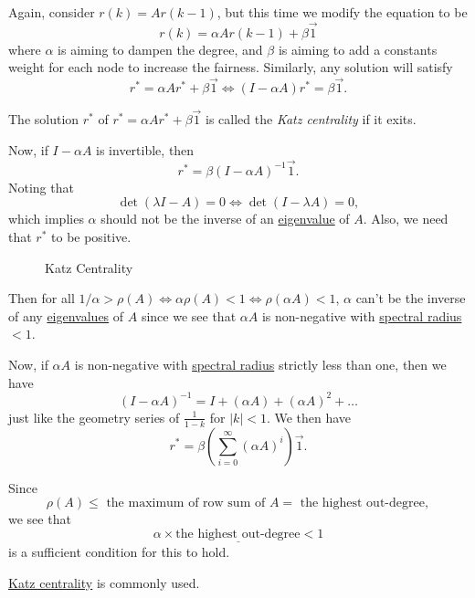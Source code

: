 \begin{problem}
Again, consider \(r(k) = Ar(k - 1)\), but this time we modify the equation to be
\[
	r(k) = \alpha Ar(k - 1) + \beta \vec{1}
\]
where \(\alpha\) is aiming to dampen the degree, and \(\beta\) is aiming to add a constants weight for each node to increase the fairness.
Similarly, any solution will satisfy
\[
	r^{\ast} = \alpha Ar^{\ast} + \beta \vec{1}\iff (I - \alpha A)r^{\ast} = \beta \vec{1}.
\]
\begin{definition}\label{def:Katz-centrality}
	The solution \(r^{\ast} \) of \(r^{\ast} = \alpha Ar^{\ast} + \beta \vec{1}\) is called the \emph{Katz centrality} if it exits.
\end{definition}

Now, if \(I - \alpha A\) is invertible, then
\[
	r^{\ast} = \beta(I - \alpha A)^{-1} \vec{1}.
\]
Noting that
\[
	\det(\lambda I - A) = 0 \iff \det(I - \lambda A) = 0,
\]
which implies \(\alpha\) should not be the inverse of an \hyperref[def:eigenvalue]{eigenvalue} of \(A\). Also, we  need that \(r^{\ast}\) to be positive.

\begin{figure}[H]
	\centering
	\caption{Katz Centrality}
	\label{fig:katz-centrality}
\end{figure}

Then for all \(1/\alpha > \rho(A) \iff \alpha\rho(A)<1 \iff \rho(\alpha A)<1\), \(\alpha\) can't be the inverse of any \hyperref[def:eigenvalue]{eigenvalues} of \(A\) since
we see that \(\alpha A\) is non-negative with \hyperref[def:spectral-radius]{spectral radius} \(<1\).

Now, if \(\alpha A\) is non-negative with \hyperref[def:spectral-radius]{spectral radius} strictly less than one, then we have
\[
	(I - \alpha A)^{-1} = I + (\alpha A) + (\alpha A)^2 + \ldots
\]
just like the geometry series of \(\frac{1}{1-k}\) for \(\left\vert k \right\vert <1 \). We then have
\[
	r^* = \beta\left(\sum\limits_{i=0}^{\infty} (\alpha A)^i\right)\vec{1}.
\]

\begin{remark}
	Since
	\[
		\rho(A) \leq \text{ the maximum of row sum of }A = \text{ the highest out-degree},
	\]
	we see that
	\[
		\underline{\alpha \times \text{the highest out-degree}<1}
	\]
	is a sufficient condition for this to hold.
\end{remark}

\begin{note}
	\hyperref[def:Katz-centrality]{Katz centrality} is commonly used.
\end{note}
\end{problem}

